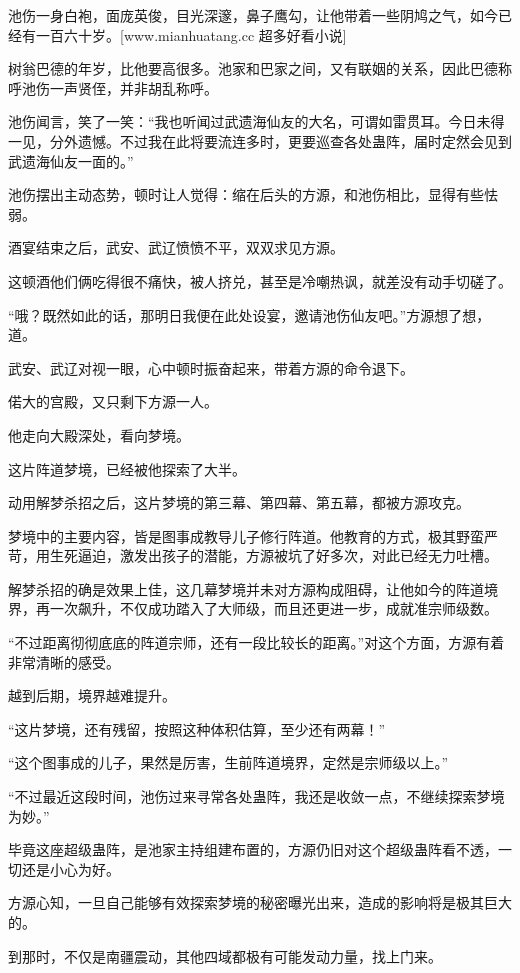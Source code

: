 \begin{this_body}
池伤一身白袍，面庞英俊，目光深邃，鼻子鹰勾，让他带着一些阴鸠之气，如今已经有一百六十岁。[www.mianhuatang.cc 超多好看小说]

树翁巴德的年岁，比他要高很多。池家和巴家之间，又有联姻的关系，因此巴德称呼池伤一声贤侄，并非胡乱称呼。

池伤闻言，笑了一笑：“我也听闻过武遗海仙友的大名，可谓如雷贯耳。今日未得一见，分外遗憾。不过我在此将要流连多时，更要巡查各处蛊阵，届时定然会见到武遗海仙友一面的。”

池伤摆出主动态势，顿时让人觉得：缩在后头的方源，和池伤相比，显得有些怯弱。

酒宴结束之后，武安、武辽愤愤不平，双双求见方源。

这顿酒他们俩吃得很不痛快，被人挤兑，甚至是冷嘲热讽，就差没有动手切磋了。

“哦？既然如此的话，那明日我便在此处设宴，邀请池伤仙友吧。”方源想了想，道。

武安、武辽对视一眼，心中顿时振奋起来，带着方源的命令退下。

偌大的宫殿，又只剩下方源一人。

他走向大殿深处，看向梦境。

这片阵道梦境，已经被他探索了大半。

动用解梦杀招之后，这片梦境的第三幕、第四幕、第五幕，都被方源攻克。

梦境中的主要内容，皆是图事成教导儿子修行阵道。他教育的方式，极其野蛮严苛，用生死逼迫，激发出孩子的潜能，方源被坑了好多次，对此已经无力吐槽。

解梦杀招的确是效果上佳，这几幕梦境并未对方源构成阻碍，让他如今的阵道境界，再一次飙升，不仅成功踏入了大师级，而且还更进一步，成就准宗师级数。

“不过距离彻彻底底的阵道宗师，还有一段比较长的距离。”对这个方面，方源有着非常清晰的感受。

越到后期，境界越难提升。

“这片梦境，还有残留，按照这种体积估算，至少还有两幕！”

“这个图事成的儿子，果然是厉害，生前阵道境界，定然是宗师级以上。”

“不过最近这段时间，池伤过来寻常各处蛊阵，我还是收敛一点，不继续探索梦境为妙。”

毕竟这座超级蛊阵，是池家主持组建布置的，方源仍旧对这个超级蛊阵看不透，一切还是小心为好。

方源心知，一旦自己能够有效探索梦境的秘密曝光出来，造成的影响将是极其巨大的。

到那时，不仅是南疆震动，其他四域都极有可能发动力量，找上门来。


\end{this_body}
